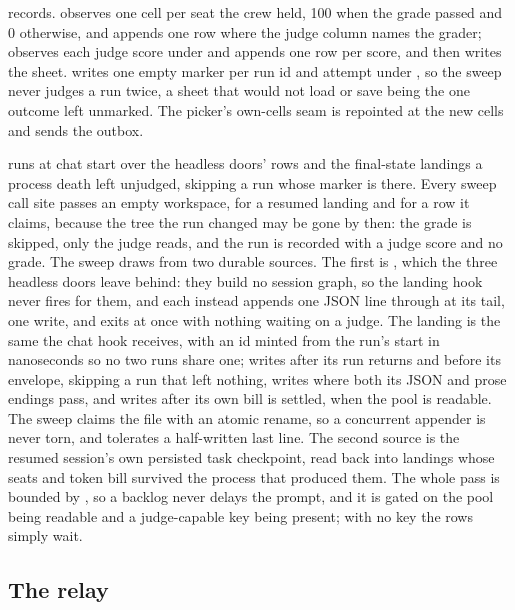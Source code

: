  records.  observes one
 cell per seat the crew held, 100 when the grade passed and 0
otherwise, and appends one row where the judge column names the grader;
 observes each judge score under  and appends
one row per score, and  then writes the sheet.
 writes one empty marker per run id and attempt under
, so the sweep never judges a run twice, a sheet that would not load
or save being the one outcome left unmarked. The picker's own-cells seam is
repointed at the new cells and  sends the outbox.

 runs at chat start over the headless doors'
 rows and the final-state landings a process death left
unjudged, skipping a run whose marker is there. Every sweep call site passes an
empty workspace,  for a resumed landing and
 for a row it claims, because the tree the run changed may be
gone by then: the grade is skipped, only the judge reads, and the run is recorded
with a judge score and no grade. The sweep draws from two durable sources. The
first is , which the three headless doors leave behind: they
build no session graph, so the landing hook never fires for them, and each
instead appends one JSON line  through
 at its tail, one  write, and exits
at once with nothing waiting on a judge. The landing is the same
 the chat hook receives, with an id minted from the
run's start in nanoseconds so no two runs share one;  writes after
its run returns and before its envelope, skipping a run that left nothing,
 writes where both its JSON and prose endings pass, and 
writes after its own bill is settled, when the pool is readable. The sweep claims the
file with an atomic rename, so a concurrent appender is never torn, and
tolerates a half-written last line. The second source is the resumed session's
own persisted task checkpoint, read back into landings whose seats and token
bill survived the process that produced them. The whole pass is bounded by
, so a backlog never delays the prompt, and it is gated
on the pool being readable and a judge-capable key being present; with no key
the rows simply wait.

\subsection{The relay}
\label{app:relay}

